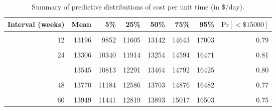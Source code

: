 \begin{table}
\centering
\caption{\label{tab:cost-per-unit-time}Summary of predictive distributions of cost per unit time (in \$/day).}
\centering
\begin{tabular}[t]{rrrrrrrr}
\toprule
Interval (weeks) & Mean & 5\% & 25\% & 50\% & 75\% & 95\% & $\text{Pr}[< \$15000]$\\
\midrule
\cellcolor{gray!10}{6} & \cellcolor{gray!10}{13773} & \cellcolor{gray!10}{9841} & \cellcolor{gray!10}{11988} & \cellcolor{gray!10}{13632} & \cellcolor{gray!10}{15348} & \cellcolor{gray!10}{18135} & \cellcolor{gray!10}{0.71}\\
12 & 13196 & 9852 & 11605 & 13142 & 14643 & 17003 & 0.79\\
\cellcolor{gray!10}{18} & \cellcolor{gray!10}{13209} & \cellcolor{gray!10}{10048} & \cellcolor{gray!10}{11710} & \cellcolor{gray!10}{13121} & \cellcolor{gray!10}{14533} & \cellcolor{gray!10}{16647} & \cellcolor{gray!10}{0.82}\\
24 & 13306 & 10340 & 11914 & 13254 & 14594 & 16471 & 0.81\\
\cellcolor{gray!10}{30} & \cellcolor{gray!10}{13420} & \cellcolor{gray!10}{10574} & \cellcolor{gray!10}{12076} & \cellcolor{gray!10}{13341} & \cellcolor{gray!10}{14692} & \cellcolor{gray!10}{16494} & \cellcolor{gray!10}{0.81}\\
\addlinespace
36 & 13545 & 10813 & 12291 & 13464 & 14792 & 16425 & 0.80\\
\cellcolor{gray!10}{42} & \cellcolor{gray!10}{13662} & \cellcolor{gray!10}{10983} & \cellcolor{gray!10}{12470} & \cellcolor{gray!10}{13578} & \cellcolor{gray!10}{14806} & \cellcolor{gray!10}{16478} & \cellcolor{gray!10}{0.78}\\
48 & 13770 & 11184 & 12586 & 13703 & 14876 & 16482 & 0.77\\
\cellcolor{gray!10}{54} & \cellcolor{gray!10}{13860} & \cellcolor{gray!10}{11322} & \cellcolor{gray!10}{12721} & \cellcolor{gray!10}{13801} & \cellcolor{gray!10}{14978} & \cellcolor{gray!10}{16485} & \cellcolor{gray!10}{0.76}\\
60 & 13949 & 11441 & 12819 & 13893 & 15017 & 16503 & 0.75\\
\bottomrule
\end{tabular}
\end{table}
